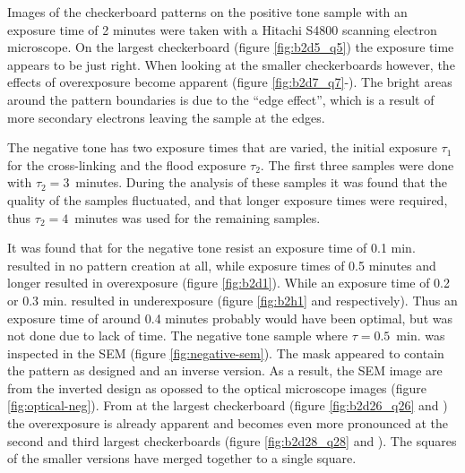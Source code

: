Images of the checkerboard patterns on the positive tone sample with an exposure time of 2 minutes were taken with a Hitachi S4800 scanning electron microscope. On the largest checkerboard (figure \ref{fig:b2d5_q5}) the exposure time appears to be just right. When looking at the smaller checkerboards however, the effects of overexposure become apparent (figure \ref{fig:b2d7_q7}-). The bright areas around the pattern boundaries is due to the ``edge effect'', which is a result of more secondary electrons leaving the sample at the edges.

The negative tone has two exposure times that are varied, the initial exposure $\tau_1$ for the cross-linking and the flood exposure $\tau_2$. The first three samples were done with $\tau_2 = 3$~minutes. During the analysis of these samples it was found that the quality of the samples fluctuated, and that longer exposure times were required, thus $\tau_2 = 4$~minutes was used for the remaining samples.

It was found that for the negative tone resist an exposure time of 0.1 min. resulted in no pattern creation at all, while exposure times of 0.5 minutes and longer resulted in overexposure (figure \ref{fig:b2d1}). While an exposure time of 0.2 or 0.3 min. resulted in underexposure (figure \ref{fig:b2h1} and  respectively). Thus an exposure time of around 0.4 minutes probably would have been optimal, but was not done due to lack of time. The negative tone sample where $\tau = 0.5$~min. was inspected in the SEM (figure \ref{fig:negative-sem}). The mask appeared to contain the pattern as designed and an inverse version. As a result, the SEM image are from the inverted design as opossed to the optical microscope images (figure \ref{fig:optical-neg}). From at the largest checkerboard (figure \ref{fig:b2d26_q26} and ) the overexposure is already apparent and becomes even more pronounced at the second and third largest checkerboards (figure \ref{fig:b2d28_q28} and ). The squares of the smaller versions have merged together to a single square.  

